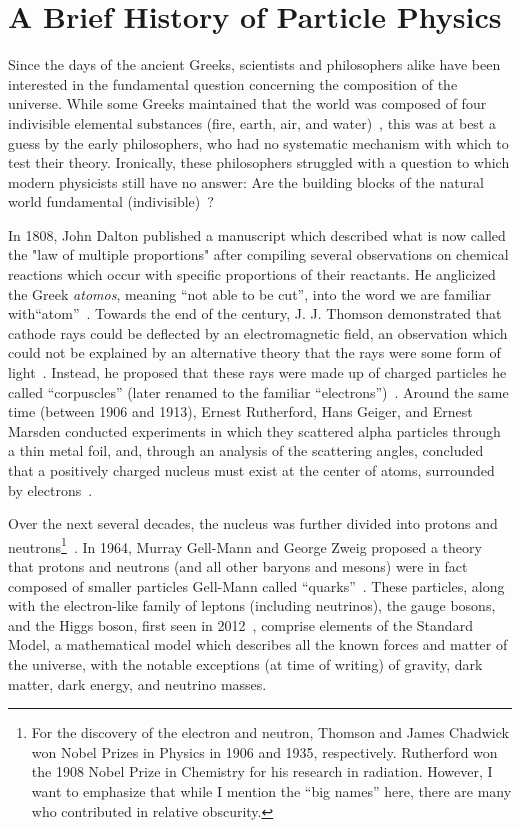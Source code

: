 \section{A Brief History of Particle Physics}\label{sec:a_brief_history_of_particle_physics}

Since the days of the ancient Greeks, scientists and philosophers alike have been interested in the fundamental question concerning the composition of the universe. While some Greeks maintained that the world was composed of four indivisible elemental substances (fire, earth, air, and water)~\cite{Ross1925}, this was at best a guess by the early philosophers, who had no systematic mechanism with which to test their theory. Ironically, these philosophers struggled with a question to which modern physicists still have no answer: Are the building blocks of the natural world fundamental (indivisible)~\cite{Hardie1984}?

In 1808, John Dalton published a manuscript which described what is now called the "law of multiple proportions" after compiling several observations on chemical reactions which occur with specific proportions of their reactants. He anglicized the Greek \textit{atomos}, meaning ``not able to be cut'', into the word we are familiar with\textemdash ``atom''~\cite{Dalton1808}. Towards the end of the century, J. J. Thomson demonstrated that cathode rays could be deflected by an electromagnetic field, an observation which could not be explained by an alternative theory that the rays were some form of light~\cite{Thomson1897}. Instead, he proposed that these rays were made up of charged particles he called ``corpuscles'' (later renamed to the familiar ``electrons'')~\cite{Thomson1907}. Around the same time (between 1906 and 1913), Ernest Rutherford, Hans Geiger, and Ernest Marsden conducted experiments in which they scattered alpha particles through a thin metal foil, and, through an analysis of the scattering angles, concluded that a positively charged nucleus must exist at the center of atoms, surrounded by electrons~\cite{Rutherford1911}.

Over the next several decades, the nucleus was further divided into protons and neutrons\footnote{For the discovery of the electron and neutron, Thomson and James Chadwick won Nobel Prizes in Physics in 1906 and 1935, respectively. Rutherford won the 1908 Nobel Prize in Chemistry for his research in radiation. However, I want to emphasize that while I mention the ``big names'' here, there are many who contributed in relative obscurity.}~\cite{Masson1921,Chadwick1932}. In 1964, Murray Gell-Mann and George Zweig proposed a theory that protons and neutrons (and all other baryons and mesons) were in fact composed of smaller particles Gell-Mann called ``quarks''~\cite{Gell-Mann1964}. These particles, along with the electron-like family of leptons (including neutrinos), the gauge bosons, and the Higgs boson, first seen in 2012~\cite{Aad2012}, comprise elements of the Standard Model, a mathematical model which describes all the known forces and matter of the universe, with the notable exceptions (at time of writing) of gravity, dark matter, dark energy, and neutrino masses.

